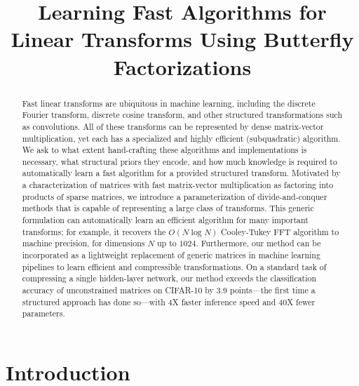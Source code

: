 \title{Learning Fast Algorithms for Linear Transforms Using Butterfly Factorizations}

\begin{abstract}
Fast linear transforms are ubiquitous in machine learning, including the discrete Fourier transform, discrete cosine transform, and other structured transformations such as convolutions. All of these transforms can be represented by dense matrix-vector multiplication, yet each has a specialized and highly efficient (subquadratic) algorithm. We ask to what extent hand-crafting these algorithms and implementations is necessary, what structural priors they encode, and how much knowledge is required to automatically learn a fast algorithm for a provided structured transform. Motivated by a characterization of matrices with fast matrix-vector multiplication as factoring into products of sparse matrices, we introduce a parameterization of divide-and-conquer methods that is capable of representing a large class of transforms. This generic formulation can automatically learn an efficient algorithm for many important transforms; for example, it recovers the $O(N \log N)$ Cooley-Tukey FFT algorithm to machine precision, for dimensions $N$ up to $1024$. Furthermore, our method can be incorporated as a lightweight replacement of generic matrices in machine learning pipelines to learn efficient and compressible transformations. On a standard task of compressing a single hidden-layer network, our method exceeds the classification accuracy of unconstrained matrices on CIFAR-10 by 3.9 points---the first time a structured approach has done so---with 4X faster inference speed and 40X fewer parameters.
\end{abstract}

\section{Introduction}
\label{sec:introduction}

